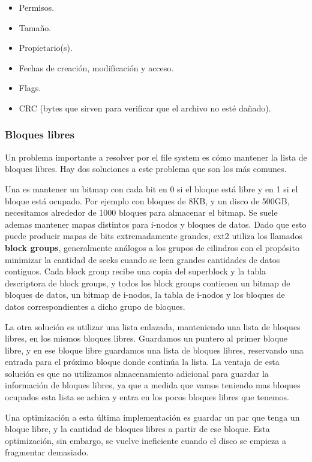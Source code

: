\documentclass{article}
\begin{document}
\begin{itemize}
\item Permisos.
\item Tama\~no.
\item Propietario(s).
\item Fechas de creaci\'on, modificaci\'on y acceso.
\item Flags.
\item CRC (bytes que sirven para verificar que el archivo no est\'e da\~nado).
\end{itemize}

\subsubsection{Bloques libres}

Un problema importante a resolver por el file system es c\'omo mantener la lista de bloques libres. Hay dos soluciones a este problema que son los m\'as comunes. 

Una es mantener un bitmap con cada bit en 0 si el bloque est\'a libre y en 1 si el bloque est\'a ocupado. Por ejemplo con bloques de 8KB, y un disco de 500GB, necesitamos alrededor de 1000 bloques para almacenar el bitmap. Se suele ademas mantener mapas distintos para i-nodos y bloques de datos. Dado que esto puede producir mapas de bits extremadamente grandes, ext2 utiliza los llamados \textbf{block groups}, generalmente análogos a los grupos de cilindros con el propósito minimizar la cantidad de seeks cuando se leen grandes cantidades de datos contiguos. Cada block group recibe una copia del superblock y la tabla descriptora de block groups, y todos los block groups contienen un bitmap de bloques de datos, un bitmap de i-nodos, la tabla de i-nodos y los bloques de datos correspondientes a dicho grupo de bloques.

La otra solución es utilizar una lista enlazada, manteniendo una lista de bloques libres, en los mismos bloques libres. Guardamos un puntero al primer bloque libre, y en ese bloque libre guardamos una lista de bloques libres, reservando una entrada para el pr\'oximo bloque donde contin\'ua la lista. La ventaja de esta solución es que no utilizamos almacenamiento adicional para guardar la información de bloques libres, ya que a medida que vamos teniendo mas bloques ocupados esta lista se achica y entra en los pocos bloques libres que tenemos.

Una optimizaci\'on a esta \'ultima implementaci\'on es guardar un par que tenga un bloque libre, y la cantidad de bloques libres a partir de ese bloque. Esta optimizaci\'on, sin embargo, se vuelve ineficiente cuando el disco se empieza a fragmentar demasiado.
\end{document}
